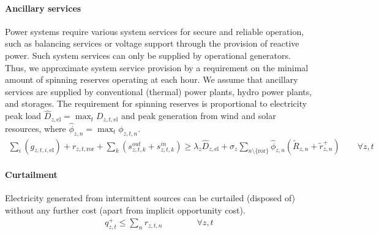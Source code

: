 \documentclass[11pt,a4paper]{article}
\begin{document}
\paragraph{Ancillary services}
Power systems require various system services for secure and reliable operation, such as balancing services or voltage support through the provision of reactive power. Such system services can only be supplied by operational generators. Thus, we approximate system service provision by a requirement on the minimal amount of spinning reserves operating at each hour. 
We assume that ancillary services are supplied by conventional (thermal) power plants, hydro power plants, and storages.
The requirement for spinning reserves is proportional to electricity peak load $\widehat{D}_{z,\text{el}} = \max_{t} D_{z,t,\text{el}}$ and peak generation from wind and solar resources, where $\widehat{\phi}_{z,n} = \max_{t} \phi_{z,t,n}$.
\begin{align}
\sum_{i}\left( g_{z,t,i,\text{el}} \right) + r_{z,t,\text{ror}} + \sum_{k} \left( s^{out}_{z,t,k} + s^{in}_{z,t,k} \right) \geq \lambda_{z} \widehat{D}_{z,\text{el}} + \sigma_{z} \sum_{n \setminus \{ \text{ror}\}} \widehat{\phi}_{z,n} (\widetilde{R}_{z,n} + \widetilde{r}^{+}_{z,n}) \qquad \forall z,t
\end{align}

\paragraph{Curtailment}
Electricity generated from intermittent sources can be curtailed (disposed of) without any further cost (apart from implicit opportunity cost). 
\begin{align}
q^{+}_{z,t} \leq \sum_{n} r_{z,t,n} \qquad \qquad \forall z, t
\end{align}
\end{document}
